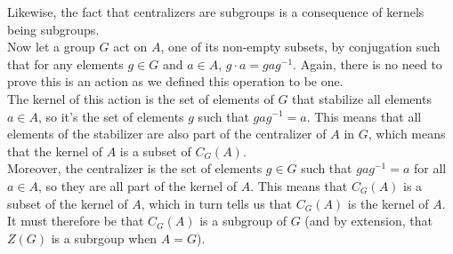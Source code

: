 \documentclass[12pt]{article}
\begin{document}
    Likewise, the fact that centralizers are subgroups
    is a consequence of kernels being subgroups. \\
    Now let a group $G$ act on $A$, one of its non-empty subsets,
    by conjugation
    such that for any elements $g \in G$ and $a \in A$,
    $g \cdot a = gag^{-1}$.
    Again, there is no need to prove this is an action as we defined
    this operation to be one. \\
    The kernel of this action is the set of elements of $G$
    that stabilize all elements $a \in A$,
    so it's the set of elements $g$ such that $gag^{-1} = a$.
    This means that all elements of the stabilizer
    are also part of the centralizer of $A$ in $G$,
    which means that the kernel of $A$ is a subset of $C_G(A)$. \\
    Moreover, the centralizer is the set of elements $g \in G$
    such that $gag^{-1} = a$ for all $a \in A$,
    so they are all part of the kernel of $A$.
    This means that $C_G(A)$ is a subset of the kernel of $A$,
    which in turn tells us that $C_G(A)$ is the kernel of $A$.
    It must therefore be that $C_G(A)$ is a subgroup of $G$
    (and by extension, that $Z(G)$ is a subrgoup when $A = G$). \\
    
\end{document}
